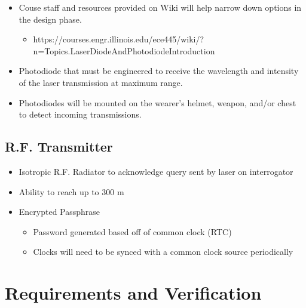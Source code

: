 \documentclass[openbib,letterpaper,10pt]{article}
\begin{document}
\begin{spacing}{1.15}
\begin{itemize}
	\item Couse staff and resources provided on Wiki will help narrow down options in the design phase.
	\begin{itemize}
		\item https://courses.engr.illinois.edu/ece445/wiki/?n=Topics.LaserDiodeAndPhotodiodeIntroduction
	\end{itemize}
	\item Photodiode that must be engineered to receive the wavelength and intensity of the laser transmission at maximum range. 
	\item Photodiodes will be mounted on the wearer's helmet, weapon, and/or chest to detect incoming transmissions.
\end{itemize}
 
 \subsection*{{\normalsize  R.F. Transmitter}}
  \begin{itemize}
  	\item Isotropic R.F. Radiator to acknowledge query sent by laser on interrogator
  	\item Ability to reach up to 300 m 
  	\item Encrypted Passphrase
  	\begin{itemize}
  		\item Password generated based off of common clock (RTC)
  		\item Clocks will need to be synced with a common clock source periodically
  	\end{itemize}
  \end{itemize}
 

  \clearpage


\section{Requirements and Verification}



\end{spacing}
\end{document}
